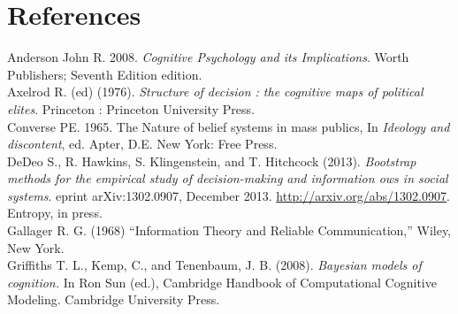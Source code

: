 \documentclass[12pt]{article}
\begin{document}
\section{References}


Anderson John R. 2008. \textit{Cognitive Psychology and its Implications}. Worth Publishers; Seventh Edition edition.
\\


Axelrod R. (ed) (1976). \textit{Structure of decision : the cognitive maps of political elites}. Princeton : Princeton University Press.
\\



Converse PE. 1965. The Nature of belief systems in mass publics, In \textit{Ideology and discontent}, ed. Apter, D.E. New York: Free Press.
\\

DeDeo S., R. Hawkins, S. Klingenstein, and T. Hitchcock (2013). \textit{Bootstrap methods for the
empirical study of decision-making and information ows in social systems}. eprint
arXiv:1302.0907, December 2013. \href{http://arxiv.org/abs/1302.0907}{http://arxiv.org/abs/1302.0907}. Entropy, in press.
\\

Gallager R. G. (1968) ``Information Theory and Reliable Communication,'' Wiley, New York.
\\

Griffiths T. L., Kemp, C., and Tenenbaum, J. B. (2008). \textit{Bayesian models of cognition.} In Ron Sun (ed.), Cambridge Handbook of Computational Cognitive Modeling. Cambridge University Press.
\\
\end{document}
